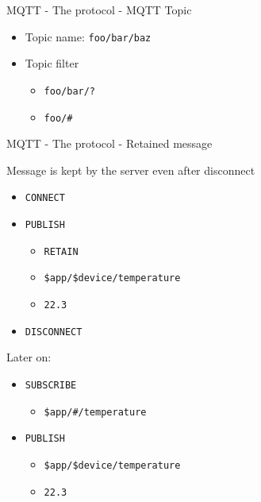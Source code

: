 \begin{frame}[fragile]{MQTT - The protocol - MQTT Topic}
\protect\hypertarget{mqtt---the-protocol---mqtt-topic}{}

\begin{itemize}
\tightlist
\item
  Topic name: \texttt{foo/bar/baz}
\item
  Topic filter

  \begin{itemize}
  \tightlist
  \item
    \texttt{foo/bar/?}
  \item
    \texttt{foo/\#}
  \end{itemize}
\end{itemize}

\end{frame}

\begin{frame}[fragile]{MQTT - The protocol - Retained message}
\protect\hypertarget{mqtt---the-protocol---retained-message}{}

Message is kept by the server even after disconnect

\begin{itemize}
\tightlist
\item
  \texttt{CONNECT}
\item
  \texttt{PUBLISH}

  \begin{itemize}
  \tightlist
  \item
    \texttt{RETAIN}
  \item
    \texttt{\$app/\$device/temperature}
  \item
    \texttt{22.3}
  \end{itemize}
\item
  \texttt{DISCONNECT}
\end{itemize}

Later on:

\begin{itemize}
\tightlist
\item
  \texttt{SUBSCRIBE}

  \begin{itemize}
  \tightlist
  \item
    \texttt{\$app/\#/temperature}
  \end{itemize}
\item
  \texttt{PUBLISH}

  \begin{itemize}
  \tightlist
  \item
    \texttt{\$app/\$device/temperature}
  \item
    \texttt{22.3}
  \end{itemize}
\end{itemize}


\end{frame}

